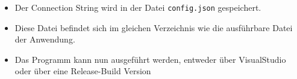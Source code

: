 \begin{itemize}
    \item Der Connection String wird in der Datei \texttt{config.json} gespeichert.
    \item Diese Datei befindet sich im gleichen Verzeichnis wie die ausführbare Datei der Anwendung.
    \item Das Programm kann nun ausgeführt werden, entweder über VisualStudio oder über eine Release-Build Version
\end{itemize}


